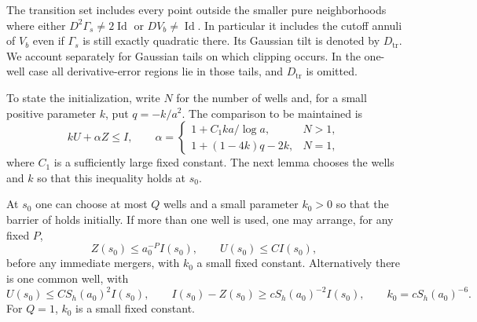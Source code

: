 The transition set includes every point outside the smaller pure
neighborhoods where either \(D^2\Gamma_s\ne2\operatorname{Id}\)
or \(DV_b\ne\operatorname{Id}\). In particular it includes the
cutoff annuli of \(V_b\) even if \(\Gamma_s\) is still exactly
quadratic there. Its Gaussian tilt is denoted by \(D_{\mathrm{tr}}\).
We account separately for Gaussian tails on which clipping occurs.
In the one-well case all derivative-error regions lie in those tails,
and \(D_{\mathrm{tr}}\) is omitted.

To state the initialization, write $N$ for the number of wells and,
for a small positive parameter $k$, put $q=-k/a^2$. The comparison to
be maintained is
\begin{equation}
 kU+\alpha Z\le I,\qquad
 \alpha=
 \begin{cases}
 1+C_1ka/\log a,&N>1,\\
 1+(1-4k)q-2k,&N=1,
 \end{cases}
 \label{ex:comparison}
\end{equation}
where $C_1$ is a sufficiently large fixed constant. The next lemma
chooses the wells and $k$ so that this inequality holds at $s_0$.

\begin{lemma}
\label{ex:initialization}
At \(s_0\) one can choose at most \(Q\) wells and a small parameter
\(k_0>0\) so that the barrier of  holds initially.
If more than one well is used, one may arrange, for any fixed \(P\),
\[
 Z(s_0)\le a_0^{-P}I(s_0),\qquad U(s_0)\le CI(s_0),
\]
before any immediate mergers, with \(k_0\) a small fixed constant.
Alternatively there is one common well, with
\[
 U(s_0)\le CS_h(a_0)^2 I(s_0),\qquad
 I(s_0)-Z(s_0)\ge cS_h(a_0)^{-2}I(s_0),
 \qquad k_0=cS_h(a_0)^{-6}.
\]
For \(Q=1\), \(k_0\) is a small fixed constant.
\end{lemma}

